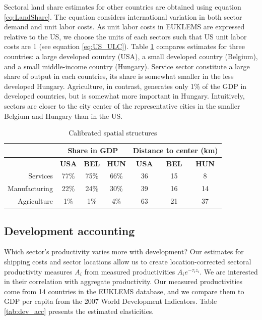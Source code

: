 \documentclass[12pt]{article}
\begin{document}
Sectoral land share estimates for other countries are obtained using equation \ref{eq:LandShare}. The equation considers international variation in both sector demand and unit labor costs. As unit labor costs in EUKLEMS are expressed relative to the US, we choose the units of each sectors such that US unit labor costs are 1 (see equation \ref{eq:US_ULC}). Table \ref{tab:spatial_eg} compares estimates for three countries: a large developed country (USA), a small developed country (Belgium), and a small middle-income country (Hungary). Service sector constitute a large share of output in each countries, its share is somewhat smaller in the less developed Hungary. Agriculture, in contrast, generates only 1\% of the GDP in developed countries, but is somewhat more important in Hungary. Intuitively, sectors are closer to the city center of the representative cities in the smaller Belgium and Hungary than in the US.

\begin{table}[h!]
  \centering
  \caption{Calibrated spatial structures}
    \begin{tabular}{rcccccc}
    \toprule
    \textbf{} & \multicolumn{3}{c}{\textbf{Share in GDP}} & \multicolumn{3}{c}{\textbf{Distance to center (km)}} \\
    \midrule
    \textbf{} & \textbf{USA} & \textbf{BEL} & \textbf{HUN} & \textbf{USA} & \textbf{BEL} & \textbf{HUN} \\
    Services & 77\%  & 75\%  & 66\%  & 36    & 15    & 8 \\
    Manufacturing & 22\%  & 24\%  & 30\%  & 39    & 16    & 14 \\
    Agriculture & 1\%   & 1\%   & 4\%   & 63    & 21    & 37 \\
    \bottomrule
    \end{tabular}%
  \label{tab:spatial_eg}%
\end{table}%

\subsection{Development accounting}

Which sector's productivity varies more with development? Our estimates for shipping costs and sector locations allow us to create location-corrected sectoral productivity measures $A_i$ from measured productivities $A_ie^{-\tau_iz_i}$. We are interested in their correlation with aggregate productivity. Our measured productivities come from 14 countries in the EUKLEMS database, and we compare them to GDP per capita from the 2007 World Development Indicators. Table \ref{tab:dev_acc} presents the estimated elasticities.
\end{document}
